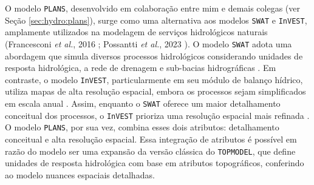 \documentclass[./main.tex]{subfiles}
\begin{document}
\par O modelo \texttt{PLANS}, desenvolvido em colaboração entre mim e demais colegas (ver Seção \ref{sec:hydro:plans}), surge como uma alternativa aos modelos \texttt{SWAT} e \texttt{InVEST}, amplamente utilizados na modelagem de serviços hidrológicos naturais (Francesconi \textit{et al.}, 2016 \cite{Francesconi2016}; Possantti \textit{et al.}, 2023 \cite{Possantti2023a}). O modelo \texttt{SWAT} adota uma abordagem que simula diversos processos hidrológicos considerando unidades de resposta hidrológica, a rede de drenagem e sub-bacias hidrográficas \cite{Strauch2013}. Em contraste, o modelo \texttt{InVEST}, particularmente em seu módulo de balanço hídrico, utiliza mapas de alta resolução espacial, embora os processos sejam simplificados em escala anual \cite{Daneshi2021a}. Assim, enquanto o \texttt{SWAT} oferece um maior detalhamento conceitual dos processos, o \texttt{InVEST} prioriza uma resolução espacial mais refinada \cite{Cong2020a}. O modelo \texttt{PLANS}, por sua vez, combina esses dois atributos: detalhamento conceitual e alta resolução espacial. Essa integração de atributos é possível em razão do modelo ser uma expansão da versão clássica do \texttt{TOPMODEL}, que define unidades de resposta hidrológica com base em atributos topográficos, conferindo ao modelo nuances espaciais detalhadas.
\end{document}
